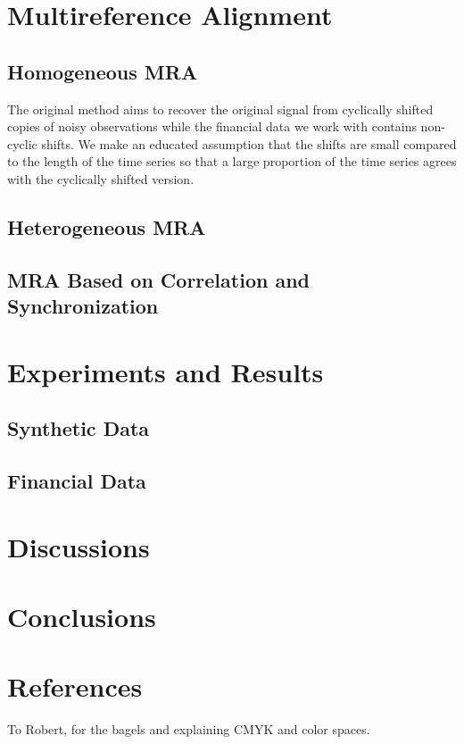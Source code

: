 \documentclass[sigconf]{acmart}
\begin{document}
\section{Multireference Alignment}
\subsection{Homogeneous MRA}
The original method aims to recover the original signal from cyclically shifted copies of noisy observations while the financial data we work with contains non-cyclic shifts. We make an educated assumption that the shifts are small compared to the length of the time series so that a large proportion of the time series agrees with the cyclically shifted version. 
\subsection{Heterogeneous MRA}
\subsection{MRA Based on Correlation and Synchronization}

\section{Experiments and Results}
\subsection{Synthetic Data}
\subsection{Financial Data}

\section{Discussions}
\section{Conclusions}

\section{References}



\begin{acks}
To Robert, for the bagels and explaining CMYK and color spaces.
\end{acks}



\end{document}
